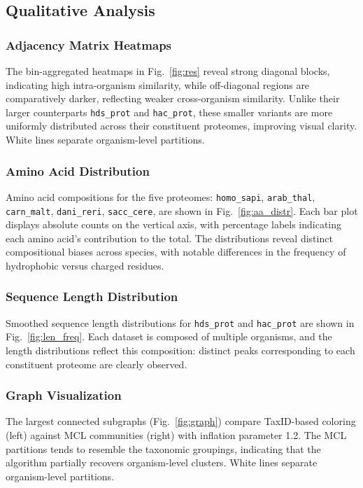 \subsection{Qualitative Analysis}

\subsubsection*{Adjacency Matrix Heatmaps}

The bin-aggregated heatmaps in Fig.~\ref{fig:res} reveal strong diagonal
blocks, indicating high intra-organism similarity, while off-diagonal regions
are comparatively darker, reflecting weaker cross-organism similarity. Unlike
their larger counterparts \texttt{hds\_prot} and \texttt{hac\_prot}, these
smaller variants are more uniformly distributed across their constituent
proteomes, improving visual clarity. White lines separate organism-level
partitions.

\subsubsection*{Amino Acid Distribution}

Amino acid compositions for the five proteomes: \texttt{homo\_sapi},
\texttt{arab\_thal}, \texttt{carn\_malt}, \texttt{dani\_reri},
\texttt{sacc\_cere}, are shown in Fig.~\ref{fig:aa_distr}. Each bar plot
displays absolute counts on the vertical axis, with percentage labels
indicating each amino acid's contribution to the total. The distributions
reveal distinct compositional biases across species, with notable differences
in the frequency of hydrophobic versus charged residues.

\subsubsection*{Sequence Length Distribution}

Smoothed sequence length distributions for \texttt{hds\_prot} and \texttt{hac\_prot} are shown in Fig.~\ref{fig:len_freq}. Each dataset is composed of multiple organisms, and the length distributions reflect this composition: distinct peaks corresponding to each constituent proteome are clearly observed.

\subsubsection*{Graph Visualization}

The largest connected subgraphs (Fig.~\ref{fig:graph}) compare TaxID-based coloring (left) against MCL communities (right) with inflation parameter 1.2. The MCL partitions tends to resemble the taxonomic groupings, indicating that the algorithm partially recovers organism-level clusters. White lines separate organism-level partitions.

